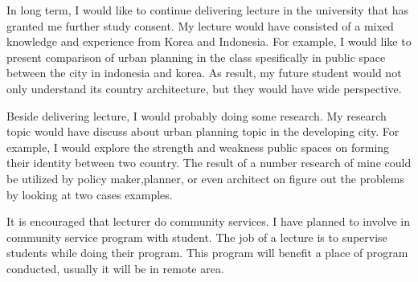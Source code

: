 \documentclass[12pt]{simart} %
\begin{document}
In long term, I would like to continue delivering lecture in the university that has granted me further study consent. My lecture would have consisted of a mixed knowledge and experience from Korea and Indonesia. For example, I would like to present comparison of urban planning in the class spesifically in public space between the city in indonesia and korea. As result, my future student would not only understand its country architecture, but they would have wide perspective.

Beside delivering lecture, I would probably doing some research. My research topic would have discuss about urban planning topic in the developing city. For example, I would explore the strength and weakness public spaces on forming their identity between two country. The result of a number research of mine could be utilized by policy maker,planner, or even architect on figure out the problems by looking at two cases examples.

It is encouraged that lecturer do community services. I have planned to involve in community service program with student. The job of a lecture is to supervise students while doing their program. This program will benefit a place of program conducted, usually it will be in remote area.


%

%
\end{document}
